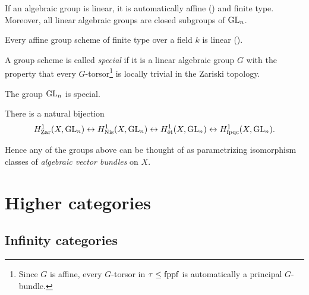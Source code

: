 \documentclass[11pt,openany]{book}
\begin{document}
\begin{note} If an algebraic group is linear, it is automatically affine (\cite[1.29]{MilneAG}) and finite type. Moreover, all linear algebraic groups are closed subgroups of $\mathrm{GL}_n$.
\end{note}


\begin{proposition} Every affine group scheme of finite type over a field $k$ is linear (\cite[4.8]{MilneAG}).
\end{proposition}



\begin{definition} \cite[pp.~5-11]{Grothendieck-torsion} A group scheme is called \textit{special} if it is a linear algebraic group $G$ with the property that every $G$-torsor\footnote{Since $G$ is affine, every $G$-torsor in $\tau\le \mathrm{fppf}$ is automatically a principal $G$-bundle.} is locally trivial in the Zariski topology.
\end{definition}

\begin{theorem} \cite[Th\'eor\`eme~3]{Grothendieck-torsion} The group $\mathrm{GL}_n$ is special.
\end{theorem}

\begin{corollary}
\label{cor:h1-gln-hilbert90} 
There is a natural bijection
\begin{align*}
    H^1_{\mathrm{Zar}}(X,\mathrm{GL}_n) \leftrightarrow H^1_{\mathrm{Nis}}(X,\mathrm{GL}_n) \leftrightarrow H^1_{\text{\'{e}t}}(X,\mathrm{GL}_n) \leftrightarrow H^1_{\mathrm{fpqc}}(X,\mathrm{GL}_n).
\end{align*}
\end{corollary}

Hence any of the groups above can be thought of as parametrizing isomorphism classes of \textit{algebraic vector bundles} on $X$.




\chapter{Higher categories}
\minitoc

\section{Infinity categories}
\end{document}
